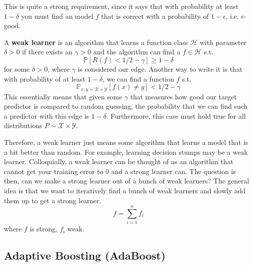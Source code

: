 \documentclass{article}
\begin{document}
    This is quite a strong requirement, since it says that with probability at least $1 - \delta$ you must find an model $f$ that is correct with a probability of $1 - \epsilon$, i.e. $\epsilon$-good.

    \begin{definition}
      A \textbf{weak learner} is an algorithm that learns a function class $\mathcal{H}$ with parameter $\delta > 0$ if there exists an $\gamma > 0$ and the algorithm can find a $f \in \mathcal{H}$ s.t. 
      \begin{equation}
        \mathbb{P}[ R(f) < 1/2 - \gamma] \geq 1 - \delta
      \end{equation}
      for some $\delta > 0$, where $\gamma$ is considered our edge. Another way to write it is that with probability of at least $1 - \delta$, we can find a function $f$ s.t. 
      \begin{equation}
        \mathbb{P}_{x, y \sim \mathcal{X} \times \mathcal{Y}} [f(x) \neq y] < 1/2 - \gamma 
      \end{equation}
      This essentially means that given some $\gamma$ that measures how good our target predictor is compared to random guessing, the probability that we can find such a predictor with this edge is $1 - \delta$. Furthermore, this case must hold true for all distributions $P \sim \mathcal{X} \times \mathcal{Y}$. 
    \end{definition}

    Therefore, a weak learner just means some algorithm that learns a model that is a bit better than random. For example, learning decision stumps may be a weak learner. Colloquially, a weak learner can be thought of as an algorithm that cannot get your training error to $0$ and a strong learner can. The question is then, can we make a strong learner out of a bunch of weak learners? The general idea is that we want to iteratively find a bunch of weak learners and slowly add them up to get a strong learner. 
    \begin{equation}
      f = \sum_{i=1}^n f_i
    \end{equation}
    where $f$ is strong, $f_i$ weak. 

  \subsection{Adaptive Boosting (AdaBoost)} 
\end{document}
